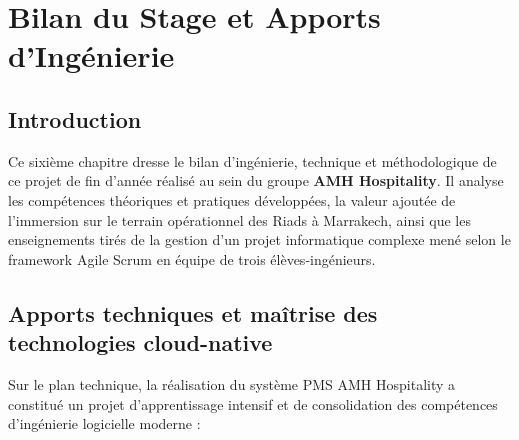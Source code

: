 \chapter{Bilan du Stage et Apports d'Ingénierie}
\label{chap:bilan}

\section{Introduction}

Ce sixième chapitre dresse le bilan d'ingénierie, technique et méthodologique de ce projet de fin d'année réalisé au sein du groupe \textbf{AMH Hospitality}. Il analyse les compétences théoriques et pratiques développées, la valeur ajoutée de l'immersion sur le terrain opérationnel des Riads à Marrakech, ainsi que les enseignements tirés de la gestion d'un projet informatique complexe mené selon le framework Agile Scrum en équipe de trois élèves-ingénieurs.

\section{Apports techniques et maîtrise des technologies cloud-native}

Sur le plan technique, la réalisation du système PMS AMH Hospitality a constitué un projet d'apprentissage intensif et de consolidation des compétences d'ingénierie logicielle moderne :

